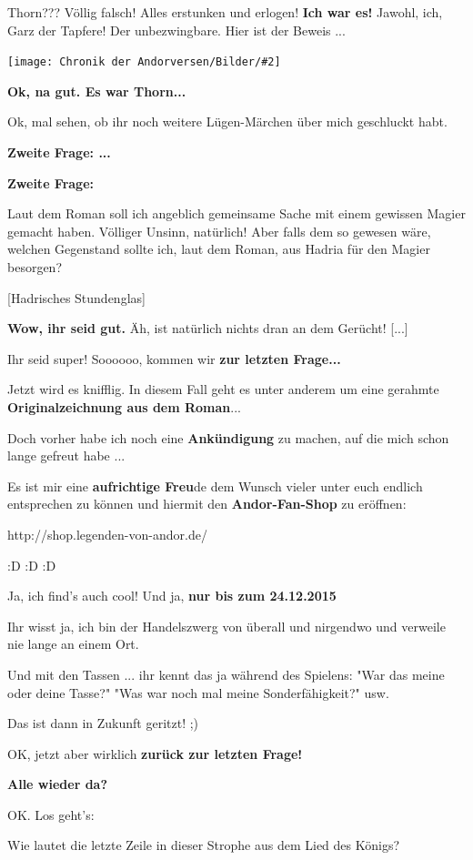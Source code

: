 \documentclass[10pt, a4paper, oneside]{book}
\newcommand{\bildmitts}[2][height=0.32\textwidth,width=0.48\textwidth,keepaspectratio]{%
    \begin{center}
        \texttt{[image: Chronik der Andorversen/Bilder/\#2]}
    \end{center}
}
\begin{document}
\begin{multicols}{2}
Thorn??? Völlig falsch! Alles erstunken und erlogen! \textbf{Ich war es!} Jawohl, ich, Garz der Tapfere! Der unbezwingbare. Hier ist der Beweis ...

\bildmitts{Garz zu Besuch in der Taverne 2.jpeg}

\textbf{Ok, na gut. Es war Thorn...}


Ok, mal sehen, ob ihr noch weitere Lügen-Märchen über mich geschluckt habt.

\textbf{Zweite Frage: ...}

\textbf{Zweite Frage:}

Laut dem Roman soll ich angeblich gemeinsame Sache mit einem gewissen Magier gemacht haben. Völliger Unsinn, natürlich! Aber falls dem so gewesen wäre, welchen Gegenstand sollte ich, laut dem Roman, aus Hadria für den Magier besorgen?

[Hadrisches Stundenglas]

\textbf{Wow, ihr seid gut.} Äh, ist natürlich nichts dran an dem Gerücht! [...]

Ihr seid super! Soooooo, kommen wir \textbf{zur letzten Frage...}

Jetzt wird es knifflig. In diesem Fall geht es unter anderem um eine gerahmte \textbf{Originalzeichnung aus dem Roman}...

Doch vorher habe ich noch eine \textbf{Ankündigung} zu machen, auf die mich schon lange gefreut habe ...

Es ist mir eine \textbf{aufrichtige Freu}de dem Wunsch vieler unter euch endlich entsprechen zu können und hiermit den \textbf{Andor-Fan-Shop} zu eröffnen:

http://shop.legenden-von-andor.de/

:D :D :D

Ja, ich find's auch cool! Und ja, \textbf{nur bis zum 24.12.2015}

Ihr wisst ja, ich bin der Handelszwerg von überall und nirgendwo und verweile nie lange an einem Ort.

Und mit den Tassen ... ihr kennt das ja während des Spielens: "War das meine oder deine Tasse?" "Was war noch mal meine Sonderfähigkeit?" usw.

Das ist dann in Zukunft geritzt! ;)

OK, jetzt aber wirklich \textbf{zurück zur letzten Frage!}

\textbf{Alle wieder da?}

OK. Los geht's:

Wie lautet die letzte Zeile in dieser Strophe aus dem Lied des Königs?


\end{multicols}
\end{document}
